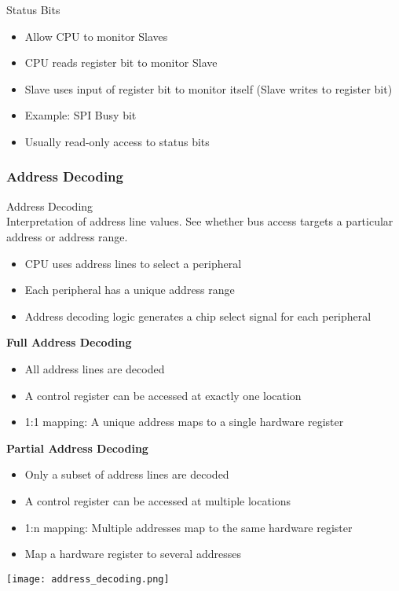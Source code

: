 \begin{concept}{Status Bits}
    \begin{itemize}
        \item Allow CPU to monitor Slaves
        \item CPU reads register bit to monitor Slave
        \item Slave uses input of register bit to monitor itself (Slave writes to register bit)
        \item Example: SPI Busy bit
        \item Usually read-only access to status bits
    \end{itemize}
\end{concept}

\multend

\subsubsection{Address Decoding}

\begin{definition}{Address Decoding}\\
    Interpretation of address line values. See whether bus access targets a particular address or address range.
    \begin{itemize}
        \item CPU uses address lines to select a peripheral
        \item Each peripheral has a unique address range
        \item Address decoding logic generates a chip select signal for each peripheral
    \end{itemize}

    \textbf{Full Address Decoding}
    \begin{itemize}
        \item All address lines are decoded
        \item A control register can be accessed at exactly one location
        \item 1:1 mapping: A unique address maps to a single hardware register
    \end{itemize}

    \textbf{Partial Address Decoding}
    \begin{itemize}
        \item Only a subset of address lines are decoded
        \item A control register can be accessed at multiple locations
        \item 1:n mapping: Multiple addresses map to the same hardware register
        \item Map a hardware register to several addresses
    \end{itemize}
    \texttt{[image: address\_decoding.png]}
\end{definition}

